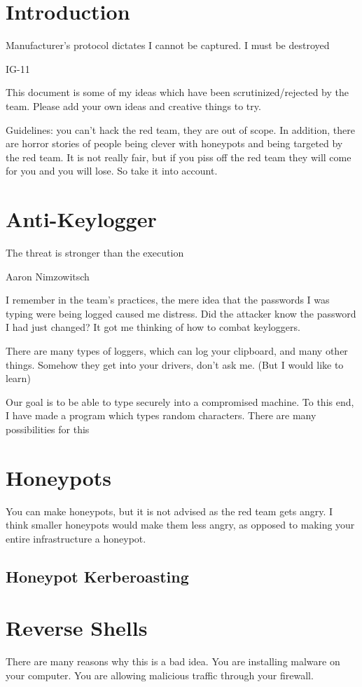 \documentclass{article}
\begin{document}
\graphicspath{ {./Images/} }
\tableofcontents

\section{Introduction}
\epigraph{Manufacturer's protocol dictates I cannot be captured. I must be destroyed}{IG-11}

This document is some of my ideas which have been scrutinized/rejected by the team. 
Please add your own ideas and creative things to try.

Guidelines: you can't hack the red team, they are out of scope.
In addition, there are horror stories of people being clever with honeypots and being targeted by the red team.
It is not really fair, but if you piss off the red team they will come for you and you will lose. So take it into account.

\section{Anti-Keylogger}
\epigraph{The threat is stronger than the execution}{Aaron Nimzowitsch}

I remember in the team's practices, the mere idea that the passwords I was typing were being logged caused me distress. 
Did the attacker know the password I had just changed? It got me thinking of how to combat keyloggers.

There are many types of loggers, which can log your clipboard, and many other things. Somehow they get into your drivers, don't ask me. (But I would like to learn)

Our goal is to be able to type securely into a compromised machine. To this end, I have made a program which types random characters. There are many possibilities for this

\section{Honeypots}
You can make honeypots, but it is not advised as the red team gets angry. 
I think smaller honeypots would make them less angry, as opposed to making 
your entire infrastructure a honeypot.

\subsection{Honeypot Kerberoasting}

\section{Reverse Shells}
There are many reasons why this is a bad idea. You are installing malware on your computer. 
You are allowing malicious traffic through your firewall.
\end{document}
